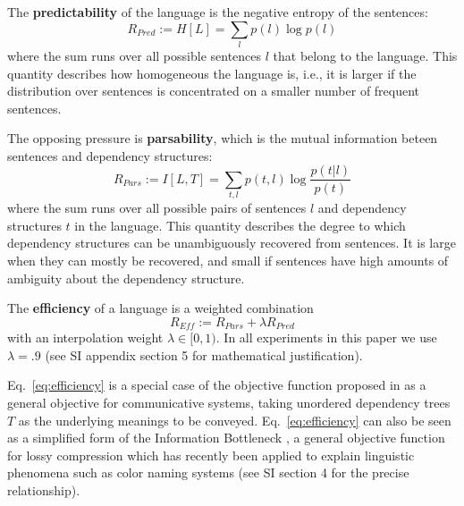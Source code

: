 \documentclass[9pt,twocolumn,twoside,lineno]{pnas-new}
\newcommand{\key}[1]{\textbf{#1}}
\begin{document}
The \key{predictability} of the language is the negative entropy of the sentences:
\begin{equation}
	R_{Pred} := H[L] = \sum_{l} p(l) \log p(l)
\end{equation}
where the sum runs over all possible sentences $l$ that belong to the language.
This quantity describes how homogeneous the language is, i.e., it is larger if the distribution over sentences is concentrated on a smaller number of frequent sentences. %

The opposing pressure is \key{parsability}, which is the mutual information beteen sentences and dependency structures:
\begin{equation}
	R_{Pars} := I[L,T] = \sum_{t,l} p(t,l) \log \frac{p(t|l)}{p(t)}
\end{equation}
where the sum runs over all possible pairs of sentences $l$ and dependency structures $t$ in the language.
This quantity describes the degree to which dependency structures can be unambiguously recovered from sentences.
It is large when they can mostly be recovered, and small if sentences have high amounts of ambiguity about the dependency structure.

The \key{efficiency} of a language is a weighted combination
\begin{equation}
	R_{Eff} := R_{Pars} + \lambda R_{Pred}
\end{equation}
with an interpolation weight $\lambda \in [0,1)$. In all experiments in this paper we use $\lambda=.9$ (see SI appendix section 5 for mathematical justification).


Eq.~\ref{eq:efficiency} is a special case of the objective function proposed in \cite{ferrericancho2002zipf,ferrericancho2007global,futrell2017memory} as a general objective for communicative systems, taking unordered dependency trees $T$ as the underlying meanings to be conveyed. Eq.~\ref{eq:efficiency} can also be seen as a simplified form of the Information Bottleneck \cite{tishby1999information}, a general objective function for lossy compression which has recently been applied to explain linguistic phenomena such as color naming systems \cite{zaslavsky2018efficient} (see SI section 4 for the precise relationship). 
\end{document}
